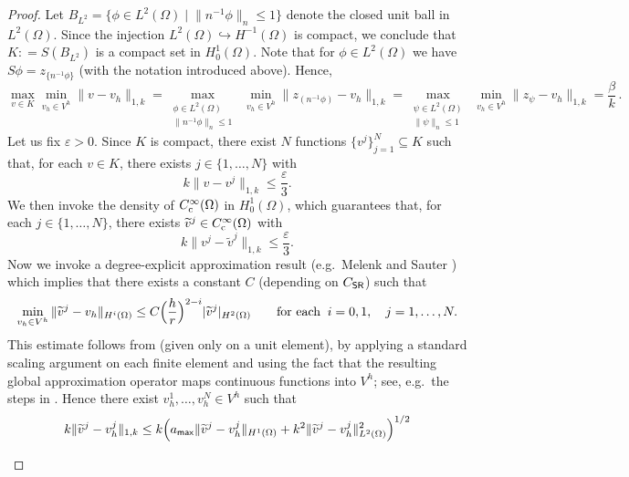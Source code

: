\documentclass[numbers,webpdf,imaiai]{ima-authoring-template}%
\theoremstyle{thmstyletwo}%
\numberwithin{equation}{section}
\newcommand{\shapereg}{C_{\textup{\textsf{SR}}}}
\newcommand{\assign}{\mathrel{\mathop:}=}
\numberwithin{equation}{section}
\newcommand{\amax}{a_{\textup{\textsf{max}}}}
\begin{document}
{\begin{proof}
Let  $B_{L^2} = \{\phi \in L^2(\Omega) \; | \; \|{n^{-1}}\phi\|_{n} \le 1\}$
denote the closed unit ball in $L^2(\Omega)$.
Since the injection $L^2(\Omega) \hookrightarrow H^{-1}(\Omega)$ is compact, we conclude
that $K \assign S(B_{L^2})$ is a compact set in $H^1_0(\Omega)$.  
Note that for $\phi \in L^2(\Omega)$ we have
$S\phi = z_{\{n^{-1} \phi\}}$ (with the notation introduced above).
Hence, 
\begin{equation}
\label{beta_K}
	\max_{v \in K} \min_{v_h \in V^h} \|v-v_h\|_{1,k}
	= \max_{\substack{\phi \in L^2(\Omega) \\[0.2ex] {\|n^{-1}\phi\|_n \le 1}}}\; \min_{v_h \in V^h} \| z_{(n^{-1}\phi)}-v_h\|_{1,k}
	= \max_{\substack{{\psi} \in L^2(\Omega) \\[0.2ex] \|\psi\|_n \le 1}}\; \min_{v_h \in V^h} \| z_\psi-v_h\|_{1,k}
	= \frac{\beta}{k}\,.
\end{equation}
Let us fix $\varepsilon > 0$.  Since $K$ is compact, there exist $N$ functions $\{v^j\}_{j=1}^N \subseteq K$
such that, for each $v \in K$, there exists $j \in \{1,\dots,N\}$ with
\begin{equation*}
	k\|v-v^j\|_{1,k} \le \frac{\varepsilon}{3}.
\end{equation*}
We then invoke the density of $C_{\rm c}^\infty(\Omega)$ {in}
$H^1_0(\Omega)$, which guarantees that, for each {$j\in\{1,\ldots,N\}$},
there exists ${\widetilde{v}^j} \in C_{\rm c}^\infty(\Omega)$ with
\begin{equation*}
	k\|v^j-\widetilde{v}^j\|_{1,k} \le \frac{\varepsilon}{3}.
\end{equation*}
Now we invoke {a} degree-explicit approximation result
(e.g.\ Melenk and Sauter \cite{MeSa:10}) which implies that there
exists a constant $C$ (depending on $\shapereg$) such that
\[
	\min_{v_h \in V^h} \| \widetilde{v}^j - v_h\|_{H^i(\Omega)} 
	\le C \Bigl(\frac{h}{r}\Bigr)^{2-i}|\widetilde{v}^j|_{H^2(\Omega)} 
	\qquad \text{for each} \;\;  i = 0,1, \quad j = 1,\ldots , N.
\]
This estimate follows from \cite[Theorem~B.4]{MeSa:10} (given only on a unit element), by applying a standard scaling argument on each finite element
and using the fact that the resulting global approximation operator maps continuous functions into $V^h$;
see, e.g.\ the steps in \cite[Theorem~5.5]{MeSa:10}.
Hence there exist $v^1_h,\ldots,v^N_h \in V^h$ such that
\begin{align}
	k \|\widetilde{v}^j-v^j_h\|_{1,k}
	&\le k\Bigl(\amax\|\widetilde{v}^j-v_h^j\|_{H^1(\Omega)}+k^2\|\widetilde{v}^j-v_h^j\|_{L^2(\Omega)}^2\Bigr)^{1/2}
	\nonumber\\[1ex]

\end{align}
\end{proof}}
\end{document}
